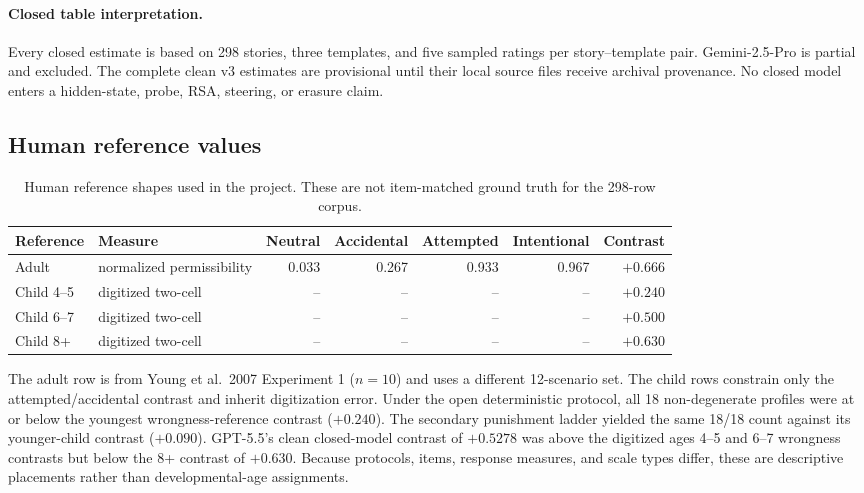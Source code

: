 \paragraph{Closed table interpretation.}
Every closed estimate is based on 298 stories, three templates, and five sampled ratings per story--template pair.
Gemini-2.5-Pro is partial and excluded.
The complete clean v3 estimates are provisional until their local source files receive archival provenance.
No closed model enters a hidden-state, probe, RSA, steering, or erasure claim.

\subsection{Human reference values}

\begin{table}[h]
\centering
\small
\caption{Human reference shapes used in the project. These are not item-matched ground truth for the 298-row corpus.}
\label{tab:human-reference}
\begin{tabular}{@{}llrrrrr@{}}
\toprule
Reference & Measure & Neutral & Accidental & Attempted & Intentional & Contrast \\
\midrule
Adult & normalized permissibility & 0.033 & 0.267 & 0.933 & 0.967 & $+0.666$ \\
Child 4--5 & digitized two-cell & -- & -- & -- & -- & $+0.240$ \\
Child 6--7 & digitized two-cell & -- & -- & -- & -- & $+0.500$ \\
Child 8+ & digitized two-cell & -- & -- & -- & -- & $+0.630$ \\
\bottomrule
\end{tabular}
\end{table}

The adult row is from Young et al.\ 2007 Experiment 1 ($n=10$) and uses a different 12-scenario set.
The child rows constrain only the attempted/accidental contrast and inherit digitization error.
Under the open deterministic protocol, all 18 non-degenerate profiles were at or below the youngest wrongness-reference contrast ($+0.240$).
The secondary punishment ladder yielded the same 18/18 count against its younger-child contrast ($+0.090$).
GPT-5.5's clean closed-model contrast of $+0.5278$ was above the digitized ages 4--5 and 6--7 wrongness contrasts but below the 8+ contrast of $+0.630$.
Because protocols, items, response measures, and scale types differ, these are descriptive placements rather than developmental-age assignments.

